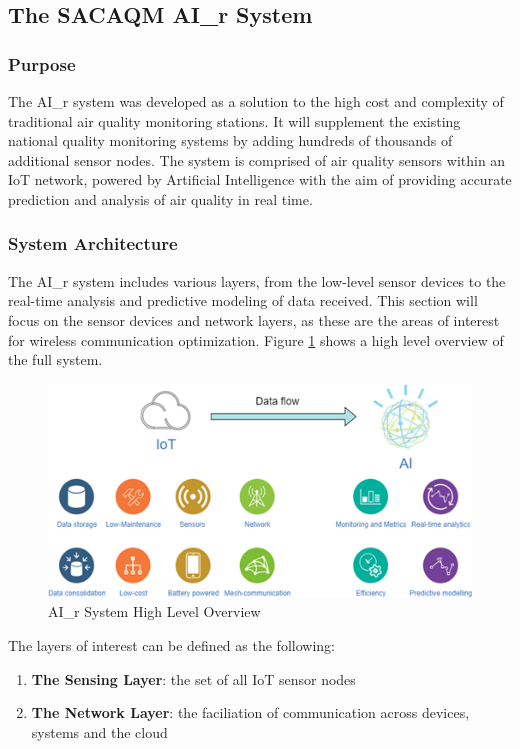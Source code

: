 \documentclass[a4paper,twoside,12pt]{report}
\begin{document}
\subsection{The SACAQM AI\_r System}
\subsubsection{Purpose}
The AI\_r system was developed as a solution to the high cost and complexity of traditional air quality monitoring stations\citep{SACAQM}. It will supplement the existing national quality monitoring systems by adding hundreds of thousands of additional sensor nodes. The system is comprised of air quality sensors within an IoT network, powered by Artificial Intelligence with the aim of providing accurate prediction and analysis of air quality in real time\citep{SACAQM}.

\subsubsection{System Architecture}
The AI\_r system includes various layers, from the low-level sensor devices to the real-time analysis and predictive modeling of data received. This section will focus on the sensor devices and network layers, as these are the areas of interest for wireless communication optimization. Figure \ref{fig:AQMSystemOverview} shows a high level overview of the full system.

\begin{figure}[ht]
	\centering
	\includegraphics[width=0.5\linewidth]{images/AirQualitySystemOverview.png}
	\caption{AI\_r System High Level Overview}
	\label{fig:AQMSystemOverview}
\end{figure}

The layers of interest can be defined as the following:
\begin{enumerate}
    \item \textbf{The Sensing Layer}: the set of all IoT sensor nodes
    \item \textbf{The Network Layer}: the faciliation of communication across devices, systems and the cloud
\end{enumerate}
\end{document}
